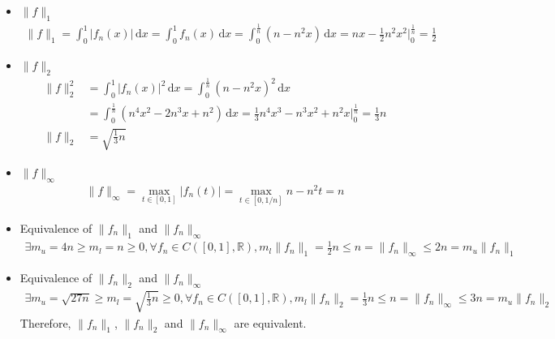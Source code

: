 \documentclass[fleqn, 10.5pt, a4paper]{article}
\def\R{{\mathbb R}}
\theoremstyle{definition}
\numberwithin{equation}{section}
\newcommand{\dx}{\, \mathrm{d} x}
\begin{document}
\begin{itemize}
\item $\|f\|_1$
\begin{align*}
	\|f\|_1 = \int_0^1 \lvert f_n(x)\rvert \dx=\int_0^1f_n(x)\dx = \int_0^{\frac{1}{n}}\left(n-n^2x\right) \dx = nx-\frac{1}{2}n^2x^2 \bigg\rvert_0^{\frac{1}{n}} = \frac{1}{2}
\end{align*}
\item $\|f\|_2$
\begin{align*}
\|f\|_2^2&=\int_0^1 \lvert f_n(x)\rvert ^2 \dx = \int_0^{\frac{1}{n}}\left(n-n^2x\right)^2\dx \\
&=\int_0^{\frac{1}{n}}\left(n^4x^2-2n^3x+n^2\right) \dx = \frac{1}{3}n^4x^3-n^3 x^2 + n^2 x \bigg\rvert_0^{\frac{1}{n}}=\frac{1}{3}n \\
\|f\|_2 &= \sqrt{\frac{1}{3}n}
\end{align*}
\item $\|f\|_\infty$
\begin{align*}
\|f\|_\infty = \max_{t \in [0,1]} \lvert f_n(t) \rvert = \max_{t\in \left[0,1/n\right]} n-n^2t=n
\end{align*}
\item Equivalence of $\|f_n\|_1$ and $\|f_n\|_\infty$
\begin{align*}
\exists m_u = 4n \geq m_l = n \geq 0, \forall f_n \in C([0,1], \R), m_l\|f_n\|_1 = \frac{1}{2}n \leq n = \|f_n\|_\infty \leq 2n = m_u\|f_n\|_1
\end{align*}
\item Equivalence of $\|f_n\|_2$ and $\|f_n\|_\infty$
\begin{align*}
\exists m_u = \sqrt{27n} \geq m_l = \sqrt{\frac{1}{3}n} \geq 0, \forall f_n \in C([0,1], \R), m_l\|f_n\|_2 = \frac{1}{3}n \leq n = \|f_n\|_\infty \leq 3n = m_u\|f_n\|_2
\end{align*}
Therefore,  $\|f_n\|_1$, $\|f_n\|_2$ and $\|f_n\|_\infty$ are equivalent.
\end{itemize}
\end{document}
